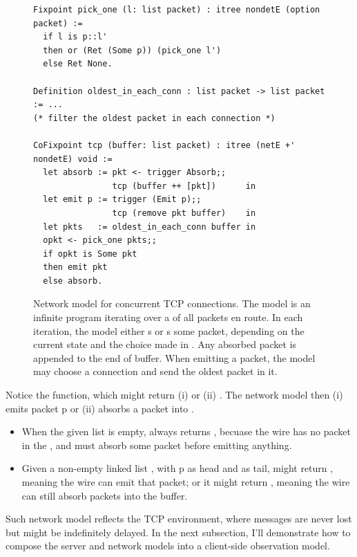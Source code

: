 \begin{figure}
\begin{lstlisting}[style=customcoq]
Fixpoint pick_one (l: list packet) : itree nondetE (option packet) :=
  if l is p::l'
  then or (Ret (Some p)) (pick_one l')
  else Ret None.

Definition oldest_in_each_conn : list packet -> list packet := ...
(* filter the oldest packet in each connection *)

CoFixpoint tcp (buffer: list packet) : itree (netE +' nondetE) void :=
  let absorb := pkt <- trigger Absorb;;
                tcp (buffer ++ [pkt])      in
  let emit p := trigger (Emit p);;
                tcp (remove pkt buffer)    in
  let pkts   := oldest_in_each_conn buffer in
  opkt <- pick_one pkts;;
  if opkt is Some pkt
  then emit pkt
  else absorb.
\end{lstlisting}
\caption[Network model for concurrent TCP connections]{Network model for
  concurrent TCP connections.  The model is an infinite program iterating over a
   of all packets en route.  In each iteration, the model either
  s or s some packet, depending on the current
   state and the choice made in .  Any absorbed packet
  is appended to the end of buffer.  When emitting a packet, the model may
  choose a connection and send the oldest packet in it.}
\label{fig:tcp-model}
\end{figure}

Notice the  function, which might return (i)  or (ii)
.    The network model then
(i) emits packet \ilc p or (ii) absorbs a packet into .

\begin{itemize}
\item When the given list  is empty,  always returns
  , becuase the wire has no packet in the , and must
  absorb some packet before emitting anything.
\item Given a non-empty linked list , with \ilc p as head and
   as tail,  might return , meaning the wire
  can emit that packet; or it might return , meaning the wire can
  still absorb packets into the buffer.
\end{itemize}

Such network model reflects the TCP environment, where messages are never lost
but might be indefinitely delayed.  In the next subsection, I'll demonstrate how
to compose the server and network models into a client-side observation model.

